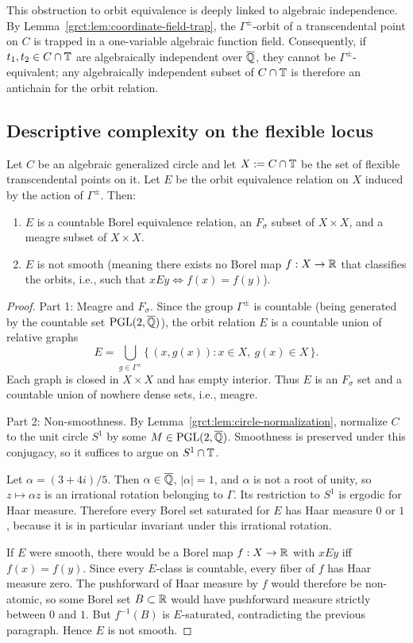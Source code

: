 This obstruction to orbit equivalence is deeply linked to algebraic independence. By Lemma~\ref{grct:lem:coordinate-field-trap}, the $\Gamma^{\pm}$-orbit of a transcendental point on $C$ is trapped in a one-variable algebraic function field. Consequently, if $t_1,t_2\in C\cap\mathbb{T}$ are algebraically independent over $\overline{\mathbb{Q}}$, they cannot be $\Gamma^{\pm}$-equivalent; any algebraically independent subset of $C\cap\mathbb{T}$ is therefore an antichain for the orbit relation.

\subsection{Descriptive complexity on the flexible locus}

\begin{theorem}\label{grct:thm:orbit-complexity-circle}
	Let $C$ be an algebraic generalized circle and let $X:=C\cap\mathbb{T}$ be the set of flexible transcendental points on it. Let $E$ be the orbit equivalence relation on $X$ induced by the action of $\Gamma^{\pm}$. Then:
	\begin{enumerate}[leftmargin=2em,itemsep=0.25ex]
		\item $E$ is a countable Borel equivalence relation, an $F_\sigma$ subset of $X\times X$, and a meagre subset of $X\times X$.
		\item $E$ is not smooth (meaning there exists no Borel map $f:X\to\mathbb{R}$ that classifies the orbits, i.e., such that $xEy \iff f(x)=f(y)$).
	\end{enumerate}
\end{theorem}
\begin{proof}
	Part 1: Meagre and $F_\sigma$.
	Since the group $\Gamma^{\pm}$ is countable (being generated by the countable set $\operatorname{PGL}(2,\overline{\mathbb{Q}})$), the orbit relation $E$ is a countable union of relative graphs
	\[
		E = \bigcup_{g\in\Gamma^{\pm}} \{\,(x,g(x)) : x\in X,\ g(x)\in X\,\}.
	\]
	Each graph is closed in $X\times X$ and has empty interior. Thus $E$ is an $F_\sigma$ set and a countable union of nowhere dense sets, i.e., meagre.

	Part 2: Non-smoothness.
	By Lemma~\ref{grct:lem:circle-normalization}, normalize $C$ to the unit circle $S^1$ by some $M\in\operatorname{PGL}(2,\overline{\mathbb{Q}})$. Smoothness is preserved under this conjugacy, so it suffices to argue on $S^1\cap\mathbb{T}$.
	
	Let $\alpha=(3+4i)/5$. Then $\alpha\in\overline{\mathbb{Q}}$, $|\alpha|=1$, and $\alpha$ is not a root of unity, so $z\mapsto \alpha z$ is an irrational rotation belonging to $\Gamma$. Its restriction to $S^1$ is ergodic for Haar measure. Therefore every Borel set saturated for $E$ has Haar measure $0$ or $1$, because it is in particular invariant under this irrational rotation.
	
	If $E$ were smooth, there would be a Borel map $f:X\to\mathbb{R}$ with $xEy$ iff $f(x)=f(y)$. Since every $E$-class is countable, every fiber of $f$ has Haar measure zero. The pushforward of Haar measure by $f$ would therefore be non-atomic, so some Borel set $B\subset\mathbb{R}$ would have pushforward measure strictly between $0$ and $1$. But $f^{-1}(B)$ is $E$-saturated, contradicting the previous paragraph. Hence $E$ is not smooth.
\end{proof}

